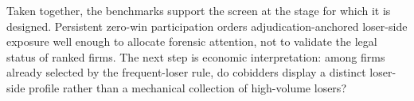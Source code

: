 Taken together, the benchmarks support the screen at the stage
for which it is designed. Persistent zero-win participation
orders adjudication-anchored loser-side exposure well enough to
allocate forensic attention, not to validate the legal status of
ranked firms. The next step is economic interpretation: among
firms already selected by the frequent-loser rule, do cobidders
display a distinct loser-side profile rather than a mechanical
collection of high-volume losers?
